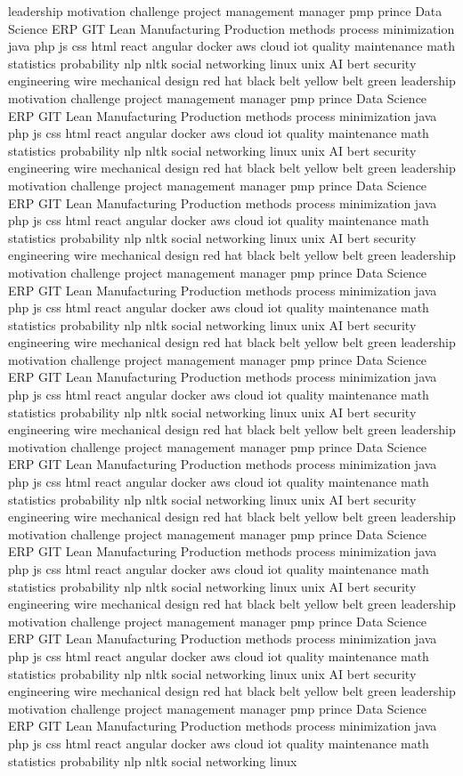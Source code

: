 \documentclass[letterpaper,11pt]{article}
\begin{document}
leadership motivation challenge project management manager pmp prince Data Science ERP GIT Lean Manufacturing Production methods process minimization java php js css html react angular docker aws cloud iot quality maintenance math statistics probability nlp nltk social networking linux unix AI bert security engineering wire mechanical design red hat black belt yellow belt green leadership motivation challenge project management manager pmp prince Data Science ERP GIT Lean Manufacturing Production methods process minimization java php js css html react angular docker aws cloud iot quality maintenance math statistics probability nlp nltk social networking linux unix AI bert security engineering wire mechanical design red hat black belt yellow belt green leadership motivation challenge project management manager pmp prince Data Science ERP GIT Lean Manufacturing Production methods process minimization java php js css html react angular docker aws cloud iot quality maintenance math statistics probability nlp nltk social networking linux unix AI bert security engineering wire mechanical design red hat black belt yellow belt green leadership motivation challenge project management manager pmp prince Data Science ERP GIT Lean Manufacturing Production methods process minimization java php js css html react angular docker aws cloud iot quality maintenance math statistics probability nlp nltk social networking linux unix AI bert security engineering wire mechanical design red hat black belt yellow belt green leadership motivation challenge project management manager pmp prince Data Science ERP GIT Lean Manufacturing Production methods process minimization java php js css html react angular docker aws cloud iot quality maintenance math statistics probability nlp nltk social networking linux unix AI bert security engineering wire mechanical design red hat black belt yellow belt green leadership motivation challenge project management manager pmp prince Data Science ERP GIT Lean Manufacturing Production methods process minimization java php js css html react angular docker aws cloud iot quality maintenance math statistics probability nlp nltk social networking linux unix AI bert security engineering wire mechanical design red hat black belt yellow belt green leadership motivation challenge project management manager pmp prince Data Science ERP GIT Lean Manufacturing Production methods process minimization java php js css html react angular docker aws cloud iot quality maintenance math statistics probability nlp nltk social networking linux unix AI bert security engineering wire mechanical design red hat black belt yellow belt green leadership motivation challenge project management manager pmp prince Data Science ERP GIT Lean Manufacturing Production methods process minimization java php js css html react angular docker aws cloud iot quality maintenance math statistics probability nlp nltk social networking linux unix AI bert security engineering wire mechanical design red hat black belt yellow belt green leadership motivation challenge project management manager pmp prince Data Science ERP GIT Lean Manufacturing Production methods process minimization java php js css html react angular docker aws cloud iot quality maintenance math statistics probability nlp nltk social networking linux 
\end{document}
